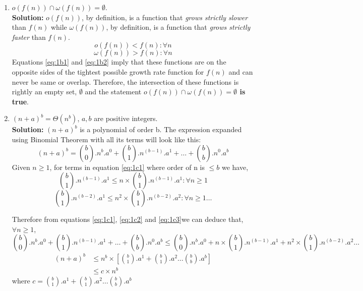 \documentclass[11pt]{article}
\begin{document}
\begin{enumerate}
    \item $o(f(n)) \cap \omega(f(n))=\emptyset$. \\
    \textbf{Solution:} $o(f(n))$, by definition, is a function that \textit{grows strictly slower} than $f(n)$ while $\omega(f(n))$, by definition, is a function that \textit{grows strictly faster} than $f(n)$.
    \begin{equation} \label{eq:1b1}
    	o(f(n)) < f(n) : \forall n
    \end{equation} 
    \begin{equation} \label{eq:1b2}
	    \omega(f(n)) > f(n) : \forall n
    \end{equation}
	Equations \ref{eq:1b1} and \ref{eq:1b2} imply that these functions are on the opposite sides of the tightest possible growth rate function for $f(n)$ and can never be same or overlap. Therefore, the intersection of these functions is rightly an empty set, $\emptyset$ and the statement \textbf{$o(f(n)) \cap \omega(f(n))=\emptyset$ is true}.
    
    \item $(n+a)^b=\Theta(n^b)$, $a, b$ are positive integers. \\
    \textbf{Solution:} $(n+a)^b$ is a polynomial of order b. The expression expanded using Binomial Theorem\cite{BinomialTheorem} with all its terms will look like this:
	\begin{equation} \label{eq:1c1}
		  (n+a)^b = {b \choose 0}.n^{b}.a^0 + {b \choose 1}.n^{(b-1)}.a^1 + \ldots + {b \choose b}.n^{0}.a^b
	\end{equation}
	Given $ n \ge 1 $, for terms in equation \ref{eq:1c1} where order of n is $ \le b$ we have,
	\begin{equation} \label{eq:1c2}
	  {b \choose 1}.n^{(b-1)}.a^1 \leq n \times {b \choose 1}.n^{(b-1)}.a^1 : \forall n \geq 1
	\end{equation}
	\begin{equation} \label{eq:1c3}
		{b \choose 1}.n^{(b-2)}.a^1 \leq n^{2} \times {b \choose 1}.n^{(b-2)}.a^2 : \forall n \geq 1 \ldots
	\end{equation}
		
	Therefore from equations \ref{eq:1c1}, \ref{eq:1c2} and \ref{eq:1c3}we can deduce that, $\forall n \geq 1$, \\
	\begin{equation*}
		{b \choose 0}.n^{b}.a^0 + {b \choose 1}.n^{(b-1)}.a^1 + \ldots + {b \choose b}.n^{0}.a^b \le {b \choose 0}.n^{b}.a^0 +  n \times {b \choose 1}.n^{(b-1)}.a^1 + n^{2} \times {b \choose 1}.n^{(b-2)}.a^{2} \ldots
	\end{equation*}
	\begin{equation*}
	\begin{split}
		(n+a)^b & \le n^{b} \times \left[{b \choose 1}.a^1 + {b \choose 1}.a^{2} \ldots {b \choose b}.a^{b}\right] \\
		& \le c \times n^{b}
	\end{split}
	\end{equation*}
	where $c = {b \choose 1}.a^1 + {b \choose 1}.a^{2} \ldots {b \choose b}.a^{b}$
	

\end{enumerate}
\end{document}

